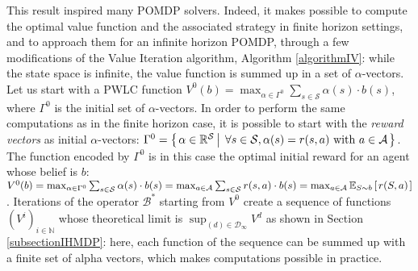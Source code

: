 This result inspired many POMDP solvers.
Indeed, it makes possible to compute the optimal value function and the associated strategy
in finite horizon settings, and to approach them for an infinite horizon POMDP,
through a few modifications of the Value Iteration algorithm, Algorithm \ref{algorithmIV}: 
while the state space is infinite, the value function is summed up in a set of $\alpha$-vectors.
Let us start with a PWLC function $V^0(b)= \displaystyle\max_{\alpha \in \Gamma^0} \sum_{s \in \mathcal{S}} \alpha(s) \cdot b(s)$,
where $\Gamma^0$ is the initial set of $\alpha$-vectors.
In order to perform the same computations as in the finite horizon case,
it is possible to start with the \textit{reward vectors} as initial $\alpha$-vectors:
$\Gamma^0 = \left\{ \left.  \alpha \in \mathbb{R}^{\mathcal{S}} \, \right| \left. \, \forall s \in \mathcal{S}, \alpha(s) = r(s,a) \mbox{ with } a \in \mathcal{A}  \right. \right\}$.
The function encoded by $\Gamma^0$ is in this case the optimal initial reward 
for an agent whose belief is $b$:
$V^0(b) 
= \max_{\alpha \in \Gamma^0} \sum_{s \in \mathcal{S}} \alpha(s) \cdot b(s) 
= \max_{a \in \mathcal{A}} \sum_{s \in \mathcal{S}} r(s,a) \cdot b(s) 
= \max_{a \in \mathcal{A}} \mathbb{E}_{S \sim b} \left[ \left.  r(S,a)  \right. \right]$.
Iterations of the operator $\mathcal{B}^*$ starting from $V^0$
create a sequence of functions $(V^i)_{i \in \mathbb{N}}$ 
whose theoretical limit is  $\sup_{(d) \in \mathcal{D}_{\infty} } V^{d}$
as shown in Section 
\ref{subsectionIHMDP}:
here, each function of the sequence can be summed up 
with a finite set of alpha vectors,
which makes computations possible in practice.

